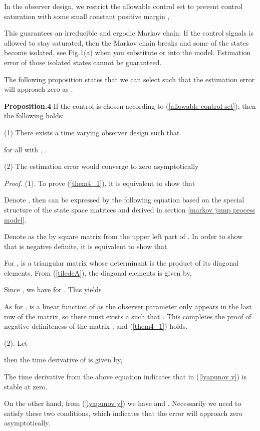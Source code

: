\documentclass[journal]{IEEEtran}
\begin{document}
In the observer design, we restrict the allowable control set to prevent control saturation with some small constant positive margin ,

This guarantees an irreducible and ergodic Markov chain. If the control signals is allowed to stay saturated, then the Markov chain breaks and some of the states become isolated, see Fig.1(a) when you substitute  or  into the model. Estimation error of those isolated states cannot be guaranteed. 

The following proposition states that we can select  such that the estimation error will approach zero as .

\textbf{Proposition.4} If the control is chosen according to (\ref{allowable control set}), then the following holds:

(1) There exists a time varying observer design  such that 

for all  with , . 

(2) The estimation error would converge to zero asymptotically 



\textit{Proof.} (1). To prove (\ref{them4_1}), it is equivalent to show that

Denote , then  can be expressed by the following equation based on the special structure of the state space matrices  and  derived in section \ref{markov jump process model}.

{\scriptsize

}

Denote  as the by square matrix from the upper left part of . In order to show that  is negative definite, it is equivalent to show that 

For ,  is a triangular matrix whose determinant is the product of its diagonal elements. From (\ref{tiledeA}), the diagonal elements  is given by,

Since , we have  for . This yields

As for ,  is a linear function of  as the observer parameter only appears in the last row of the matrix, so there must exists a  such that . This completes the proof of negative definiteness of the matrix , and (\ref{them4_1}) holds.

(2). Let 

then the time derivative of  is given by,

The time derivative from the above equation indicates that  in (\ref{lyapunov y}) is stable at zero. 

On the other hand, from (\ref{lyapunov y}) we have  and . Necessarily we need  to satisfy these two conditions, which indicates that the error will approach zero asymptotically.
\end{document}
